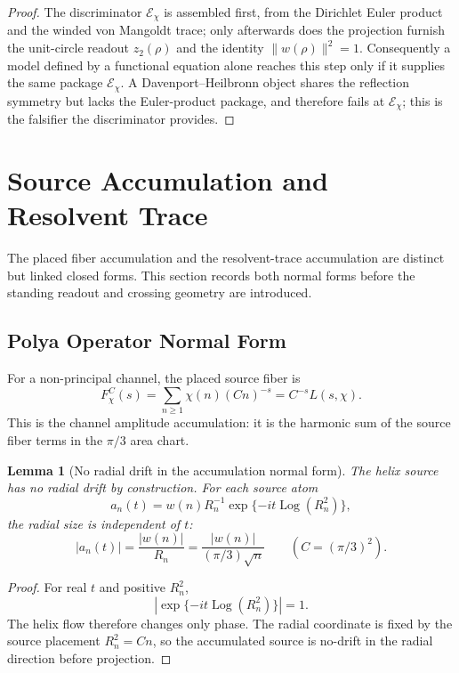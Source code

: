 \documentclass[11pt]{article}
\newtheorem{lemma}[definition]{Lemma}
\DeclareMathOperator{\Log}{Log}
\begin{document}
\begin{proof}
The discriminator $\mathcal E_\chi$ is assembled first, from the Dirichlet Euler
product and the winded von Mangoldt trace; only afterwards does the projection
furnish the unit-circle readout $z_2(\rho)$ and the identity
$\lVert w(\rho)\rVert^2=1$.  Consequently a model defined by a functional
equation alone reaches this step only if it supplies the same package
$\mathcal E_\chi$.  A Davenport--Heilbronn object shares the reflection symmetry
but lacks the Euler-product package, and therefore fails at $\mathcal E_\chi$;
this is the falsifier the discriminator provides.
\end{proof}

\section{Source Accumulation and Resolvent Trace}

The placed fiber accumulation and the resolvent-trace accumulation are distinct
but linked closed forms.  This section records both normal forms before the
standing readout and crossing geometry are introduced.

\subsection{Polya Operator Normal Form}

For a non-principal channel, the placed source fiber is
\[
  F_\chi^C(s)
  =
  \sum_{n\ge1}\chi(n)(Cn)^{-s}
  =
  C^{-s}L(s,\chi).
\]
This is the channel amplitude accumulation: it is the harmonic sum of the
source fiber terms in the $\pi/3$ area chart.

\begin{lemma}[No radial drift in the accumulation normal form]
The helix source has no radial drift by construction.  For each source atom
\[
  a_n(t)=w(n)R_n^{-1}\exp\{-it\Log(R_n^2)\},
\]
the radial size is independent of $t$:
\[
  |a_n(t)|
  =
  \frac{|w(n)|}{R_n}
  =
  \frac{|w(n)|}{(\pi/3)\sqrt n}
  \qquad (C=(\pi/3)^2).
\]
\end{lemma}

\begin{proof}
For real $t$ and positive $R_n^2$,
\[
  \left|\exp\{-it\Log(R_n^2)\}\right|=1.
\]
The helix flow therefore changes only phase.  The radial coordinate is fixed by
the source placement $R_n^2=Cn$, so the accumulated source is no-drift in the
radial direction before projection.
\end{proof}
\end{document}
